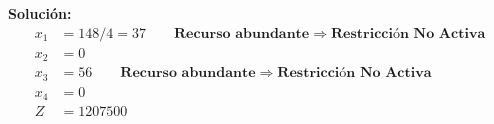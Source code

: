 \documentclass{templateNote}
\begin{document}
\begin{itemize}
    \textbf{Solución:}
    \begin{align*}
        x_1 &= 148/4 = 37 \qquad \textbf{Recurso abundante} \Rightarrow \textbf{Restricción No Activa}\\
        x_2 &= 0 \\
        x_3 &= 56 \qquad \textbf{Recurso abundante} \Rightarrow \textbf{Restricción No Activa}\\
        x_4 &= 0 \\
        Z &= 1207500
    \end{align*}
\end{itemize}
\end{document}
